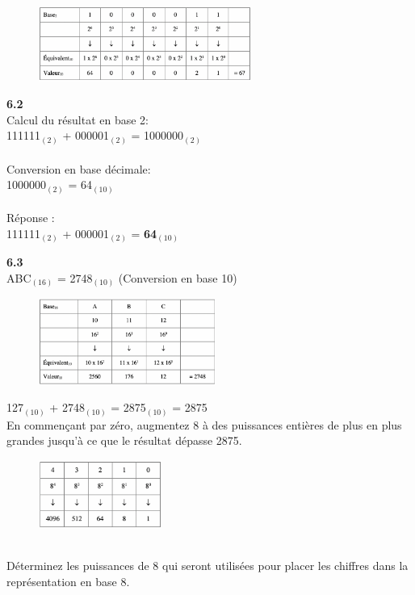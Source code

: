 \begin{Exercice}[20 minutes]
\begin{solution}
        \begin{figure}[h]
            \includegraphics[width=0.62\textwidth]{img/6-1.png}
        \end{figure}
    \end{solution}
    \begin{solution} \textbf{6.2}\\
        Calcul du résultat en base 2:\\
        111111$_{(2)}$ + 000001$_{(2)}$ = 1000000$_{(2)}$\\\\
        Conversion en base décimale:\\
        1000000$_{(2)}$ = 64$_{(10)}$\\\\
        Réponse :\\
        111111$_{(2)}$ + 000001$_{(2)}$ = \textbf{64$_{(10)}$}\\
    \end{solution}
    
    \begin{solution} \textbf{6.3}\\
        ABC$_{(16)}$ = 2748$_{(10)}$ (Conversion en base 10)\\
        \begin{figure}[h]
            \includegraphics[width=0.52\textwidth]{img/6-3-1.png}
        \end{figure}  
        
        127$_{(10)}$ + 2748$_{(10)}$ = 2875$_{(10)}$ = 2875\\

        En commençant par zéro, augmentez 8 à des puissances entières de plus en plus grandes jusqu'à ce que le résultat dépasse 2875.\\
        \begin{figure}[h]
            \includegraphics[width=0.36\textwidth]{img/6-3-2.png}
        \end{figure}\\
        Déterminez les puissances de 8 qui seront utilisées pour placer les chiffres dans la représentation en base 8.\\


\end{solution}
\end{Exercice}
